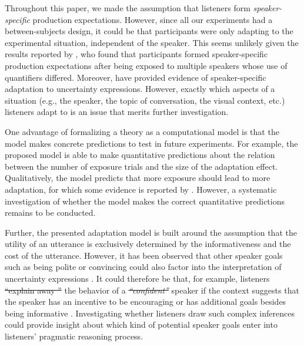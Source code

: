 \documentclass[man, floatsintext]{apa6}
\newcommand{\jd}[1]{\textcolor{PinkyPurple}{\textbf{[jd: #1]}}}
\providecommand{\DIFadd}[1]{{\protect\color{blue}\uwave{#1}}} %
\providecommand{\DIFdel}[1]{{\protect\color{red}\sout{#1}}}                      %
\providecommand{\DIFaddbegin}{} %
\providecommand{\DIFaddend}{} %
\providecommand{\DIFdelbegin}{} %
\providecommand{\DIFdelend}{} %
\newcommand{\DIFscaledelfig}{0.5}
\newlength{\DIFdelgraphicswidth} %
\newlength{\DIFdelgraphicsheight} %
\newcommand{\DIFaddincludegraphics}[2][]{{\color{blue}\fbox{\DIFOincludegraphics[#1]{#2}}}} %
\newcommand{\DIFdelincludegraphics}[2][]{%
\sbox{\DIFdelgraphicsbox}{\DIFOincludegraphics[#1]{#2}}%
\settoboxwidth{\DIFdelgraphicswidth}{\DIFdelgraphicsbox} %
\settoboxtotalheight{\DIFdelgraphicsheight}{\DIFdelgraphicsbox} %
\scalebox{\DIFscaledelfig}{%
\parbox[b]{\DIFdelgraphicswidth}{\usebox{\DIFdelgraphicsbox}\\[-\baselineskip] \rule{\DIFdelgraphicswidth}{0em}}\llap{\resizebox{\DIFdelgraphicswidth}{\DIFdelgraphicsheight}{%
\setlength{\unitlength}{\DIFdelgraphicswidth}%
\begin{picture}(1,1)%
\thicklines\linethickness{2pt} %
{\color[rgb]{1,0,0}\put(0,0){\framebox(1,1){}}}%
{\color[rgb]{1,0,0}\put(0,0){\line( 1,1){1}}}%
{\color[rgb]{1,0,0}\put(0,1){\line(1,-1){1}}}%
\end{picture}%
}\hspace*{3pt}}} %
} %
\DeclareRobustCommand{\DIFaddbegin}{\DIFOaddbegin \let\includegraphics\DIFaddincludegraphics} %
\DeclareRobustCommand{\DIFaddend}{\DIFOaddend \let\includegraphics\DIFOincludegraphics} %
\DeclareRobustCommand{\DIFdelbegin}{\DIFOdelbegin \let\includegraphics\DIFdelincludegraphics} %
\DeclareRobustCommand{\DIFdelend}{\DIFOaddend \let\includegraphics\DIFOincludegraphics} %
\begin{document}
Throughout this paper, we made the assumption that listeners  form \textit{speaker-specific} production expectations. However,
since all our experiments had a between-subjects design, it could be that participants were only adapting to the experimental
situation, independent of the speaker. This seems unlikely given the results reported by \textcite{Yildirim2016}, who found that
participants formed speaker-specific production expectations after being exposed to multiple speakers whose use of
quantifiers differed. Moreover,  \DIFdelbegin %
\DIFdelend \DIFaddbegin \DIFadd{\textcite{Schuster2019} }\DIFaddend have provided evidence of speaker-specific adaptation to 
uncertainty expressions. However, exactly which aspects of a situation (e.g., the speaker, the topic of conversation, the visual context, etc.)
listeners adapt to is an issue that merits further investigation.


One advantage of formalizing a theory as a computational model is that the model 
makes concrete predictions to test in future experiments. For example, the proposed
model is able to make quantitative predictions about the relation between the number of exposure
trials and the size of the adaptation effect. Qualitatively, the model predicts that more exposure
should lead to more adaptation, for which some evidence is reported by \textcite{Schuster2019}.
However,  a systematic investigation of whether the model makes the correct quantitative predictions remains to be conducted. 


Further, the presented adaptation model is built around the assumption that the utility of an utterance is exclusively determined
by the informativeness and the cost of the utterance. However, it has been observed that other speaker goals such as being polite or
convincing could also factor into the interpretation of uncertainty expressions \parencite[see e.g,][]{Pighin2011,Juanchich2013,Holtgraves2016}.
It could therefore be that, for example, listeners \DIFdelbegin \DIFdel{``explain away '' }\DIFdelend \DIFaddbegin \DIFadd{explain away }\DIFaddend the behavior of a \DIFdelbegin \textit{\DIFdel{``confident''}} %
\DIFdelend \DIFaddbegin \DIFadd{``confident'' }\DIFaddend speaker if the context suggests that the speaker
has an incentive to be encouraging or has additional goals besides being informative \parencite[see also][]{Yoon2016,Yoon2017}. Investigating whether listeners draw such complex inferences
could provide  insight about which kind of potential speaker goals enter into listeners' pragmatic reasoning process.
\end{document}
